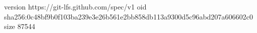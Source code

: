 version https://git-lfs.github.com/spec/v1
oid sha256:0c48bf9b0f103ba239e3e26b561e2bb858db113a9300d5c96abd207a606602c0
size 87544
